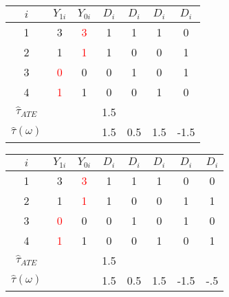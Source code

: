 \documentclass{beamer}
\numberwithin{equation}{section}
\begin{document}
\begin{frame}
\begin{overprint}
\begin{tabular}{ccccccc}
\multicolumn{1}{p{1cm}}{\center $i$} &   \multicolumn{1}{p{1cm}}{\center $Y_{1i}$} & \multicolumn{1}{p{1cm}}{\center $Y_{0i}$} &   \multicolumn{1}{p{1cm}}{\center $D_{i}$} &\multicolumn{1}{p{.5cm}}{\center $D_{i}$} &\multicolumn{1}{p{.5cm}}{\center $D_{i}$} & \multicolumn{1}{p{.5cm}}{\center $D_{i}$} \\
\hline
\rowcolor{gray!30}        1 &          3 &        \textcolor{red}{3} &                  1 & 1     & 1 & 0 \\
\rowcolor{gray!10}         2 &         1 &       \textcolor{red}{1} &                    1 & 0    & 0 & 1 \\
\rowcolor{gray!10}         3 &          \textcolor{red}{0} &         0 &                    0 & 1 & 0 & 1\\
\rowcolor{gray!30}         4 &          \textcolor{red}{1} &         1 &                    0 & 0 & 1 & 0\\
\hline
$\widehat{\tau}_{ATE}$    &                               &                       &   1.5   &  &   & \\
$\hat\tau(\omega)$    &                               &                       & 1.5  &  0.5       &1.5&-1.5  \\
\end{tabular}
\begin{tabular}{cccccccc}
 \multicolumn{1}{p{1cm}}{\center $i$} &   \multicolumn{1}{p{1cm}}{\center $Y_{1i}$} & \multicolumn{1}{p{1cm}}{\center $Y_{0i}$} &   \multicolumn{1}{p{1cm}}{\center $D_{i}$} &\multicolumn{1}{p{.5cm}}{\center $D_{i}$} &\multicolumn{1}{p{.5cm}}{\center $D_{i}$} & \multicolumn{1}{p{.5cm}}{\center $D_{i}$} & \multicolumn{1}{p{.5cm}}{\center $D_{i}$} \\
\hline
\rowcolor{gray!30}        1 &          3 &        \textcolor{red}{3} &                  1 & 1     & 1 & 0 & 0\\
\rowcolor{gray!10}         2 &         1 &       \textcolor{red}{1} &                    1 & 0    & 0 & 1 & 1\\
\rowcolor{gray!30}         3 &          \textcolor{red}{0} &         0 &                    0 & 1 & 0 & 1 & 0 \\
\rowcolor{gray!10}         4 &          \textcolor{red}{1} &         1 &                    0 & 0 & 1 & 0 & 1\\
\hline
$\widehat{\tau}_{ATE}$    &                               &                       &   1.5   &  &   & & \\
$\hat\tau(\omega)$    &                               &                       & 1.5  &  0.5       &1.5&-1.5&-.5  \\

\end{tabular}
\end{overprint}
\end{frame}
\end{document}
